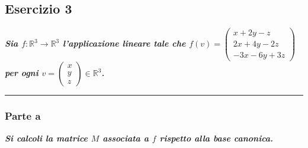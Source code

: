 \documentclass[a4paper]{article}
\newcommand{\longline}{\noindent\rule{\textwidth}{0.4pt}}
\begin{document}
	\subsection{Esercizio 3}

	\textcolor{Green4}{\textbf{\emph{Sia $f: \mathbb{R}^{3} \rightarrow \mathbb{R}^{3}$ l'applicazione lineare tale che $f\left(v\right) = \begin{pmatrix}
		x+2y-z \\
		2x+4y-2z \\
		-3x-6y+3z
	\end{pmatrix}$ per ogni $v=\begin{pmatrix}
		x \\ y \\ z
	\end{pmatrix} \in \mathbb{R}^{3}$.}}}

	\longline

	\subsubsection{Parte a}

	\textcolor{Green4}{\textbf{\emph{Si calcoli la matrice $M$ associata a $f$ rispetto alla base canonica.}}}\newline
\end{document}
